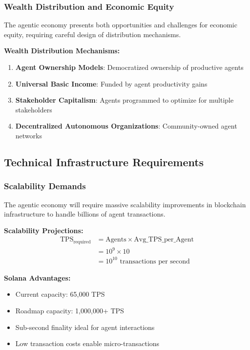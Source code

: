 \documentclass[12pt,a4paper]{article}
\begin{document}
\subsubsection{Wealth Distribution and Economic Equity}

The agentic economy presents both opportunities and challenges for economic equity, requiring careful design of distribution mechanisms.

\textbf{Wealth Distribution Mechanisms:}
\begin{enumerate}
\item \textbf{Agent Ownership Models}: Democratized ownership of productive agents
\item \textbf{Universal Basic Income}: Funded by agent productivity gains
\item \textbf{Stakeholder Capitalism}: Agents programmed to optimize for multiple stakeholders
\item \textbf{Decentralized Autonomous Organizations}: Community-owned agent networks
\end{enumerate}

\subsection{Technical Infrastructure Requirements}

\subsubsection{Scalability Demands}

The agentic economy will require massive scalability improvements in blockchain infrastructure to handle billions of agent transactions.

\textbf{Scalability Projections:}
\begin{align}
\text{TPS}_{\text{required}} &= \text{Agents} \times \text{Avg\_TPS\_per\_Agent} \\
&= 10^9 \times 10 \\
&= 10^{10} \text{ transactions per second}
\end{align}

\textbf{Solana Advantages:}
\begin{itemize}
\item Current capacity: 65,000 TPS
\item Roadmap capacity: 1,000,000+ TPS
\item Sub-second finality ideal for agent interactions
\item Low transaction costs enable micro-transactions
\end{itemize}
\end{document}
